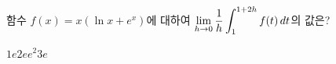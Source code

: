 \hspace*{2mm}\begin{minipage}[t]{\dimexpr\linewidth-2mm\relax}\vspace{0pt}
함수 $f(x)=x(\ln x+e^x)$에 대하여 $\displaystyle\lim_{h\to 0}\dfrac{1}{h}\int_{1}^{1+2h}f(t)\mkern3mu dt$의 값은?
\begin{choices32}{$1$}{$e$}{$2e$}{$e^2$}{$3e$}\end{choices32}\end{minipage}
